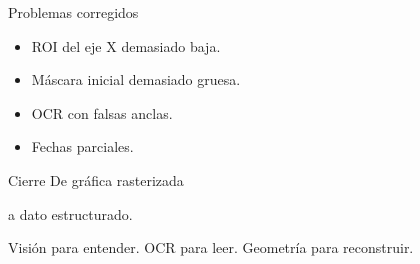 ﻿\documentclass[aspectratio=169,12pt]{beamer}
\newcommand{\muted}[1]{{\color{soft}#1}}
\begin{document}
\begin{frame}{Problemas corregidos}
  \Large
  \begin{itemize}
    \item ROI del eje X demasiado baja.
    \item M\'ascara inicial demasiado gruesa.
    \item OCR con falsas anclas.
    \item Fechas parciales.
  \end{itemize}

\end{frame}

\begin{frame}{Cierre}
  \vspace{0.9cm}
  {\Huge De gr\'afica rasterizada}

  \vspace{0.35cm}
  {\Huge a dato estructurado.}

  \vspace{1cm}
  {\Large\muted{Visi\'on para entender. OCR para leer. Geometr\'ia para reconstruir.}}
\end{frame}
\end{document}
